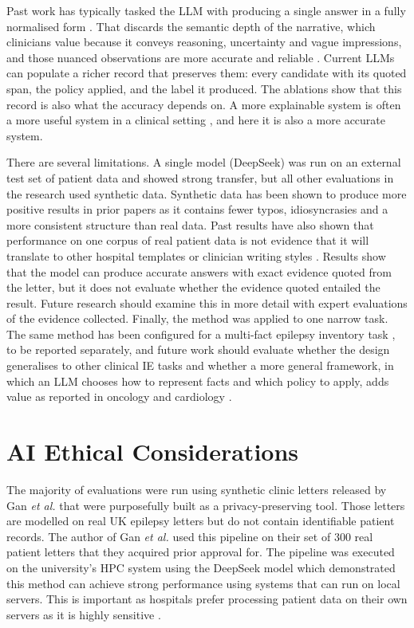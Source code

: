 \documentclass[conference]{IEEEtran}
\begin{document}
Past work has typically tasked the LLM with producing a single 
answer in a fully normalised form \cite{b3}. That discards the 
semantic depth of the narrative, which clinicians value because 
it conveys reasoning, uncertainty and vague impressions, and 
those nuanced observations are more accurate and 
reliable \cite{b18}. Current LLMs can populate a richer record 
that preserves them: every candidate with its quoted span, the 
policy applied, and the label it produced. The ablations show 
that this record is also what the accuracy depends on. A more 
explainable system is often a more useful system in a clinical 
setting \cite{b14}, and here it is also a more accurate system.

There are several limitations. A single model (DeepSeek)
was run on an external test set of patient data and showed 
strong transfer, but all other evaluations in the research used 
synthetic data. Synthetic data has been shown to produce more 
positive results in prior papers as it contains fewer typos, 
idiosyncrasies and a more consistent structure than real data. 
Past results have also shown that performance on one corpus 
of real patient data is not evidence that it will translate to 
other hospital templates or clinician writing styles \cite{b8}. Results
show that the model can produce accurate answers with exact
evidence quoted from the letter, but it does not evaluate whether
the evidence quoted entailed the result. Future research should
examine this in more detail with expert evaluations of the evidence
collected. Finally, the method was applied to one narrow task.
The same method has been configured for a multi-fact 
epilepsy inventory task \cite{b7}, to be reported separately, 
and future work should evaluate whether the design generalises 
to other clinical IE tasks and whether a more general 
framework, in which an LLM chooses how to represent facts and 
which policy to apply, adds value as reported in 
oncology \cite{b19} and cardiology \cite{b20}.

\section{AI Ethical Considerations}

The majority of evaluations were run using synthetic clinic letters
released by Gan \emph{et al.} \cite{b3} that were purposefully
built as a privacy-preserving tool. Those letters are modelled
on real UK epilepsy letters but do not contain identifiable
patient records. The author of Gan \emph{et al.} \cite{b3} 
used this pipeline on their set of 300 real patient letters that
they acquired prior approval for. The pipeline was executed
on the university's HPC system using the DeepSeek model
which demonstrated this method can achieve strong performance
using systems that can run on local servers. This is important as 
hospitals prefer processing patient data on their own servers as it is 
highly sensitive \cite{b6}. 
\end{document}
